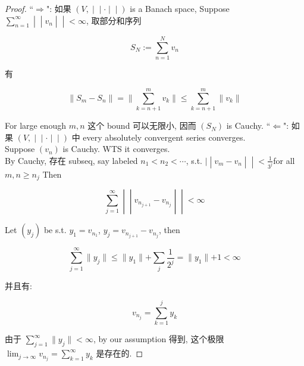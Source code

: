 \begin{proof}

``\(\Longrightarrow\)": 如果 \(\left. (V, \middle| \middle| \cdot \middle| \middle| ) \right.\) is a Banach space, Suppose \(\left. \sum_{n = 1}^{\infty} \middle| \middle| v_{n} \middle| \middle| < \infty \right.\), 取部分和序列

\[S_{N} := \sum\limits_{n = 1}^{N}v_{n}\]

有

\[\parallel S_{m} - S_{n} \parallel = \parallel \sum\limits_{k = n + 1}^{m}v_{k} \parallel \leq \sum\limits_{k = n + 1}^{m} \parallel v_{k} \parallel\]

For large enough \(m,n\) 这个 bound 可以无限小, 因而 \((S_{N})\) is Cauchy. ``\(\Longleftarrow\)": 如果 \(\left. (V, \middle| \middle| \cdot \middle| \middle| ) \right.\) 中 every absolutely convergent series converges.\\
Suppose \((v_{n})\) is Cauchy. WTS it converges.\\
By Cauchy, 存在 subseq, say labeled \(n_{1} < n_{2} < \cdots\), s.t. \(\left. | \middle| v_{m} - v_{n} \middle| \middle| < \frac{1}{3^{j}} \right.\)for all \(m,n \geq n_{j}\) Then

\[\left. \sum\limits_{j = 1}^{\infty} \middle| \middle| v_{n_{j + 1}} - v_{n_{j}} \middle| \middle| < \infty \right.\]

Let \((y_{j})\) be s.t. \(y_{1} = v_{n_{1}}\), \(y_{j} = v_{n_{j + 1}} - v_{n_{j}}\), then

\[\sum\limits_{j = 1}^{\infty} \parallel y_{j} \parallel \leq \parallel y_{1} \parallel + \sum\limits_{j}\frac{1}{2^{j}} = \parallel y_{1} \parallel + 1 < \infty\]

并且有:

\[v_{n_{j}} = \sum\limits_{k = 1}^{j}y_{k}\]

由于 \(\sum_{j = 1}^{\infty} \parallel y_{j} \parallel < \infty\), by our assumption 得到, 这个极限 \(\lim_{j\rightarrow\infty}v_{n_{j}} = \sum_{k = 1}^{\infty}y_{k}\) 是存在的.

\end{proof}

